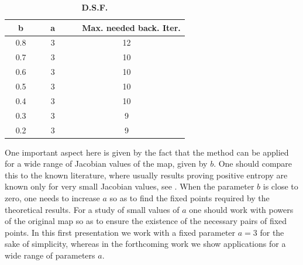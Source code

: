 \documentclass[12pt,a4paper]{amsart}
\theoremstyle{definition}
\theoremstyle{remark}
\begin{document}
\begin{table}[ht]
\caption{\textbf{D.S.F.}} %
\centering %
\begin{tabular}{|c |c | c|} %
\hline %
\ \ \textbf{b}\ \  &\ \ \textbf{a}\ \  & \ \  \textbf{Max. needed back. Iter.}  \\ [0.5ex] %
\hline %
0.8 & 3  & 12\\
0.7 & 3  & 10\\
0.6 & 3  & 10\\
0.5 & 3  & 10\\
0.4 & 3  & 10\\
0.3 & 3  & 9\\
0.2 & 3  & 9\\
\hline %
\end{tabular}
\label{table:nonlin} %
\end{table}

One important aspect here is given by the fact that the method can be applied for a wide range of Jacobian values
of the map, given by $b$. One should compare this to the known literature, where usually results proving positive entropy are known only for very small Jacobian values, see
\cite{linyoungkicked}. When the parameter $b$ is close to zero, one needs to increase $a$ so as to find the fixed points required by the theoretical results. For a study of small values of $a$ one should work with powers of the original map so as to ensure the existence of the necessary pairs of fixed points. In this first presentation we work with a fixed parameter $a=3$
for the sake of simplicity, whereas in the forthcoming work we show applications for a
wide range of parameters $a$.




\end{document}
